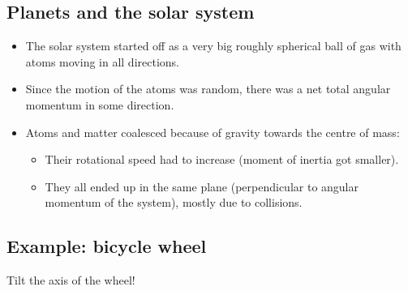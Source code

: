 \documentclass[aspectratio=169,
hyperref={colorlinks,urlcolor=blue}
]{beamer}
\begin{document}
\subsection{Planets and the solar system}
\label{subsec:planets and the solar system}
{
\begin{itemize}
\item The solar system started off as a very big roughly spherical ball of gas with atoms moving in all directions.
\item Since the motion of the atoms was random, there was a net total angular momentum in some direction.
\item Atoms and matter coalesced because of gravity towards the centre of mass:
\begin{itemize}
\item Their rotational speed had to increase (moment of inertia got smaller).
\item They all ended up in the same plane (perpendicular to angular momentum of the system), mostly due to collisions.
\end{itemize}
\end{itemize}
}{
}




\subsection{Example: bicycle wheel}
\label{subsec:bicyclewheelexample}
{Tilt the axis of the wheel!}
{

\begin{center}

\end{center}
}
\end{document}
